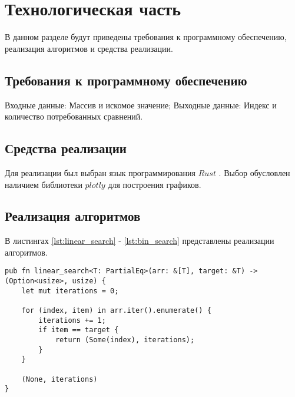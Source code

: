 \chapter{Технологическая часть}

В данном разделе будут приведены требования к программному обеспечению,
реализация алгоритмов и средства реализации.

\section{Требования к программному обеспечению}

Входные данные: Массив и искомое значение;
Выходные данные: Индекс и количество потребованных сравнений.

\section{Средства реализации}

Для реализации был выбран язык программирования $Rust$ \cite{rust}. Выбор обусловлен наличием библиотеки
$plotly$ \cite{plotly} для построения графиков.

\section{Реализация алгоритмов}

В листингах \ref{lst:linear_search} - \ref{lst:bin_search} представлены реализации алгоритмов.

\begin{center}
\captionsetup{justification=raggedright,singlelinecheck=off}
\begin{lstlisting}[label=lst:linear_search,caption=Алгоритм нахождения объектов линейным поиском]
pub fn linear_search<T: PartialEq>(arr: &[T], target: &T) -> (Option<usize>, usize) {
    let mut iterations = 0;

    for (index, item) in arr.iter().enumerate() {
        iterations += 1;
        if item == target {
            return (Some(index), iterations);
        }
    }

    (None, iterations)
}
\end{lstlisting}
\end{center}

